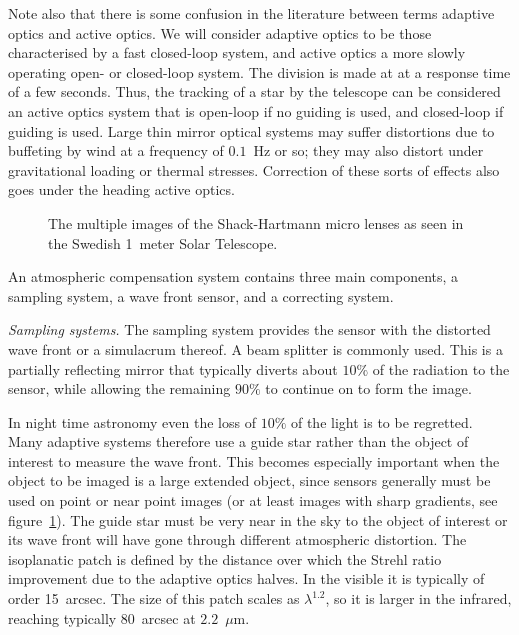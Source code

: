 \documentclass{article}
\begin{document}
Note also that there is some confusion in the literature between terms 
adaptive optics and active optics. We will consider adaptive optics to
be those characterised by a fast closed-loop system, and active optics 
a more slowly operating open- or closed-loop system. The division is made
at at a response time of a few seconds. Thus, the tracking of a star by 
the telescope can be considered an active optics system that is open-loop 
if no guiding is used, and closed-loop if guiding is used. Large thin mirror
optical systems may suffer distortions due to buffeting by wind at a 
frequency of $0.1$~Hz or so; they may also distort under gravitational loading
or thermal stresses. Correction of these sorts of effects also goes under
the heading active optics. 

\begin{figure}[h]
  \hfil{}\hfil
  \caption{The multiple images of the Shack-Hartmann micro lenses as seen 
in the Swedish 1~meter Solar Telescope.}
  \label{fig:ao_live_display}
\end{figure}

An atmospheric compensation system contains three main components, a
sampling system, a wave front sensor, and a correcting system.

\noindent
{\it Sampling systems.} The sampling system provides the sensor with the 
distorted wave front or a simulacrum thereof. A beam splitter is commonly used.
This is a partially reflecting mirror that typically diverts about 
$10\%$ of the radiation to the sensor, while allowing the remaining $90\%$
 to continue on to form the image. 

In night time astronomy even the loss of $10\%$ of the light is to be 
regretted. Many adaptive systems therefore use a guide star rather than the
object of interest to measure the wave front. This becomes especially important
when the object to be imaged is a large extended object, since sensors 
generally must be used on point or near point images (or at least images with
sharp gradients, see figure~\ref{fig:ao_live_display}). The guide star
must be very near in the sky to the object of interest or its wave front will
have gone through different atmospheric distortion. The isoplanatic patch
is defined by the distance over which the Strehl ratio improvement due to
the adaptive optics halves. In the visible it is typically of order
15~arcsec. The size of this patch scales as $\lambda^{1.2}$, so it is larger
in the infrared, reaching typically 80~arcsec at $2.2$~$\mu$m.
\end{document}
